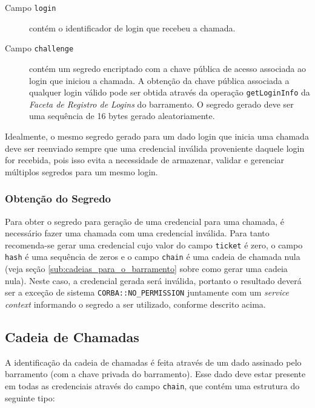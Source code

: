 \documentclass[]{article}
\newcommand{\term}[1]{\textit{#1}}
\newcommand{\code}[1]{\texttt{#1}}
\begin{document}
\begin{description}
	\item[Campo \code{login}] contém o identificador de login que recebeu a chamada.
	\item[Campo \code{challenge}] contém um segredo encriptado com a chave pública de acesso associada ao login que iniciou a chamada.
	A obtenção da chave pública associada a qualquer login válido pode ser obtida através da operação \code{getLoginInfo} da \term{Faceta de Registro de Logins} do barramento.
	O segredo gerado deve ser uma sequência de 16 bytes gerado aleatoriamente.
\end{description}

Idealmente, o mesmo segredo gerado para um dado login que inicia uma chamada deve ser reenviado sempre que uma credencial inválida proveniente daquele login for recebida, pois isso evita a necessidade de armazenar, validar e gerenciar múltiplos segredos para um mesmo login.


\subsubsection{Obtenção do Segredo} %
\label{sub:obtencao_do_segredo}

Para obter o segredo para geração de uma credencial para uma chamada, é necessário fazer uma chamada com uma credencial inválida.
Para tanto recomenda-se gerar uma credencial cujo valor do campo \code{ticket} é zero, o campo \code{hash} é uma sequência de zeros e o campo \code{chain} é uma cadeia de chamada nula (veja seção \ref{sub:cadeias_para_o_barramento} sobre como gerar uma cadeia nula).
Neste caso, a credencial gerada será inválida, portanto o resultado deverá ser a exceção de sistema \code{CORBA::NO\_PERMISSION} juntamente com um \term{service context} informando o segredo a ser utilizado, conforme descrito acima.



\subsection{Cadeia de Chamadas} %
\label{sub:cadeia_de_chamadas}

A identificação da cadeia de chamadas é feita através de um dado assinado pelo barramento (com a chave privada do barramento).
Esse dado deve estar presente em todas as credenciais através do campo \code{chain}, que contém uma estrutura do seguinte tipo:
\end{document}
